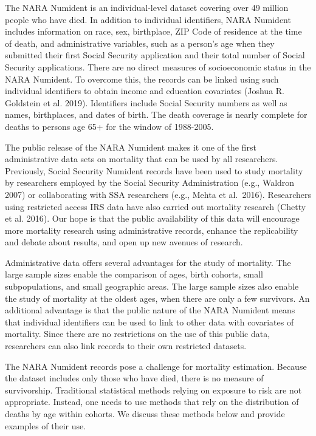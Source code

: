 \documentclass[
  11pt,
]{article}
\begin{document}
The NARA Numident is an individual-level dataset covering over 49
million people who have died. In addition to individual identifiers,
NARA Numident includes information on race, sex, birthplace, ZIP Code of
residence at the time of death, and administrative variables, such as a
person's age when they submitted their first Social Security application
and their total number of Social Security applications. There are no
direct measures of socioeconomic status in the NARA Numident. To
overcome this, the records can be linked using such individual
identifiers to obtain income and education covariates (Joshua R.
Goldstein et al. 2019). Identifiers include Social Security numbers as
well as names, birthplaces, and dates of birth. The death coverage is
nearly complete for deaths to persons age 65+ for the window of
1988-2005.

The public release of the NARA Numident makes it one of the first
administrative data sets on mortality that can be used by all
researchers. Previously, Social Security Numident records have been used
to study mortality by researchers employed by the Social Security
Administration (e.g., Waldron 2007) or collaborating with SSA
researchers (e.g., Mehta et al.~2016). Researchers using restricted
access IRS data have also carried out mortality research (Chetty et al.
2016). Our hope is that the public availability of this data will
encourage more mortality research using administrative records, enhance
the replicability and debate about results, and open up new avenues of
research.

Administrative data offers several advantages for the study of
mortality. The large sample sizes enable the comparison of ages, birth
cohorts, small subpopulations, and small geographic areas. The large
sample sizes also enable the study of mortality at the oldest ages, when
there are only a few survivors. An additional advantage is that the
public nature of the NARA Numident means that individual identifiers can
be used to link to other data with covariates of mortality. Since there
are no restrictions on the use of this public data, researchers can also
link records to their own restricted datasets.

The NARA Numident records pose a challenge for mortality estimation.
Because the dataset includes only those who have died, there is no
measure of survivorship. Traditional statistical methods relying on
exposure to risk are not appropriate. Instead, one needs to use methods
that rely on the distribution of deaths by age within cohorts. We
discuss these methods below and provide examples of their use.
\end{document}
